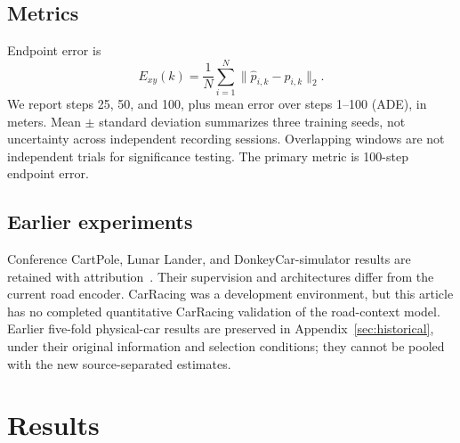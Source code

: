 \documentclass[preprint,12pt]{elsarticle}
\begin{document}
\subsection{Metrics}

Endpoint error is
\begin{equation}
 E_{xy}(k)=\frac1N\sum_{i=1}^{N}\|\hat p_{i,k}-p_{i,k}\|_2.\label{eq:metric_exy}
\end{equation}
We report steps 25, 50, and 100, plus mean error over steps 1--100 (ADE), in meters.
Mean $\pm$ standard deviation summarizes three training seeds, not uncertainty
across independent recording sessions. Overlapping windows are not independent
trials for significance testing. The primary metric is 100-step endpoint error.

\subsection{Earlier experiments}
Conference CartPole, Lunar Lander, and DonkeyCar-simulator results are retained
with attribution~\cite{piwm_conf}. Their supervision and architectures differ
from the current road encoder. CarRacing was a development environment, but this
article has no completed quantitative CarRacing validation of the road-context
model. Earlier five-fold physical-car results are preserved in
Appendix~\ref{sec:historical}, under their original information and selection
conditions; they cannot be pooled with the new source-separated estimates.

\section{Results}\label{sec:results}
\end{document}
